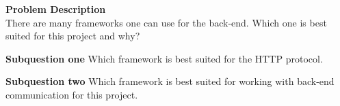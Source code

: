 \textbf{Problem Description}\\
There are many frameworks one can use for the back-end. Which one is best suited for this project and why?

\textbf{Subquestion one}
Which framework is best suited for the HTTP protocol.

\textbf{Subquestion two}
Which framework is best suited for working with back-end communication for this project.